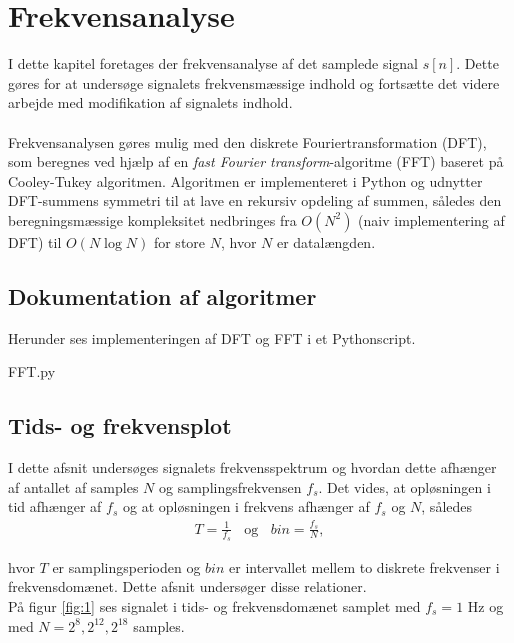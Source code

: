 \chapter{Frekvensanalyse}
I dette kapitel foretages der frekvensanalyse af det samplede signal $s[n]$. Dette gøres for at undersøge signalets frekvensmæssige indhold og fortsætte det videre arbejde med modifikation af signalets indhold.\\\\
Frekvensanalysen gøres mulig med den diskrete Fouriertransformation (DFT), som beregnes ved hjælp af en \textit{fast Fourier transform}-algoritme (FFT) baseret på Cooley-Tukey algoritmen. Algoritmen er implementeret i Python og udnytter DFT-summens symmetri til at lave en rekursiv opdeling af summen, således den beregningsmæssige kompleksitet nedbringes fra $O(N^2)$ (naiv implementering af DFT) til $O(N\log N)$ for store $N$, hvor $N$ er datalængden.

\section{Dokumentation af algoritmer}
Herunder ses implementeringen af DFT og FFT i et Pythonscript.
\begin{lstinputlisting}{FFT.py}
\end{lstinputlisting}

\section{Tids- og frekvensplot}
I dette afsnit undersøges signalets frekvensspektrum og hvordan dette afhænger af antallet af samples $N$ og samplingsfrekvensen $f_s$. Det vides, at opløsningen i tid afhænger af $f_s$ og at opløsningen i frekvens afhænger af $f_s$ og $N$, således
\begin{align} \label{eq:tidsoploesning}
T = \frac{1}{f_s}\phantom{m}\text{og}\phantom{m} bin=\frac{f_s}{N},
\end{align}

hvor $T$ er samplingsperioden og $bin$ er intervallet mellem to diskrete frekvenser i frekvensdomænet. Dette afsnit undersøger disse relationer.\\
På figur \ref{fig:1} ses signalet i tids- og frekvensdomænet samplet med $f_s=1$ Hz og med $N=2^8, 2^{12}, 2^{18}$ samples.

